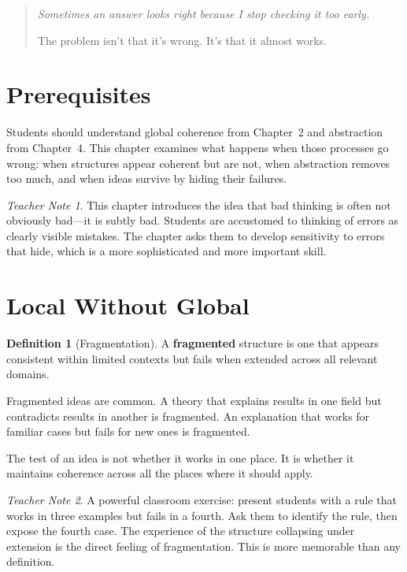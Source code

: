 \documentclass[11pt]{book}
\theoremstyle{definition}
\newtheorem{definition}{Definition}[chapter]
\theoremstyle{remark}
\newtheorem{teachernote}{Teacher Note}[chapter]
\newenvironment{deepthought}
  {\begin{quote}\itshape}
  {\end{quote}}
\begin{document}
\begin{deepthought}
Sometimes an answer looks right because I stop checking it too early.

The problem isn't that it's wrong. It's that it almost works.
\end{deepthought}

\section*{Prerequisites}

Students should understand global coherence from Chapter~2 and
abstraction from Chapter~4. This chapter examines what happens when
those processes go wrong: when structures appear coherent but are not,
when abstraction removes too much, and when ideas survive by hiding
their failures.

\begin{teachernote}
This chapter introduces the idea that bad thinking is often not
obviously bad---it is subtly bad. Students are accustomed to thinking
of errors as clearly visible mistakes. The chapter asks them to develop
sensitivity to errors that hide, which is a more sophisticated and more
important skill.
\end{teachernote}

\section{Local Without Global}

\begin{definition}[Fragmentation]
A \textbf{fragmented} structure is one that appears consistent within
limited contexts but fails when extended across all relevant domains.
\end{definition}

Fragmented ideas are common. A theory that explains results in one field
but contradicts results in another is fragmented. An explanation that works
for familiar cases but fails for new ones is fragmented.

The test of an idea is not whether it works in one place. It is whether it
maintains coherence across all the places where it should apply.

\begin{teachernote}
A powerful classroom exercise: present students with a rule that works
in three examples but fails in a fourth. Ask them to identify the rule,
then expose the fourth case. The experience of the structure collapsing
under extension is the direct feeling of fragmentation. This is more
memorable than any definition.
\end{teachernote}
\end{document}
